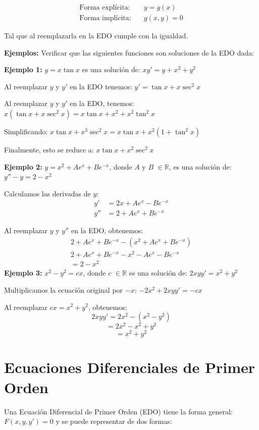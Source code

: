 \documentclass[12pt,letterpaper]{article}
\begin{document}
\[
\begin{aligned}
\text{Forma explícita:} & \quad y = g(x) \\
\text{Forma implícita:} & \quad g(x, y) = 0
\end{aligned}
\]

Tal que al reemplazarla en la EDO cumple con la igualdad.

\textbf{Ejemplos:} Verificar que las siguientes funciones son soluciones de la EDO dada:

\textbf{Ejemplo 1:}
$y = x\tan x$
es una solución de:
$xy' = y + x^2 + y^2$

Al reemplazar $y$ y $y'$ en la EDO tenemos:
$y' = \tan x + x\sec^2 x$

Al reemplazar $y$ y $y'$ en la EDO, tenemos:
$x(\tan x + x\sec^2 x) = x\tan x + x^2 + x ^2\tan ^2 x$

Simplificando:
$x\tan x + x^3\sec^2 x = x\tan x + x^2(1 + \tan^2 x)$

Finalmente, esto se reduce a:
$x\tan x + x^2\sec^2 x$


\textbf{Ejemplo 2:} $y = x^2 + A e^x + B e^{-x}$, donde $A$ y $B$ $\in\mathbb{R}$, 
es una solución de:
$y'' - y = 2 - x^2$

Calculamos las derivadas de $y$:
\[
\begin{aligned}
y' &= 2x + A e^x - B e^{-x} \\
y'' &= 2 + A e^x + B e^{-x}
\end{aligned}
\]

Al reemplazar $y$ y $y''$ en la EDO, obtenemos:
\[
\begin{aligned}
2 + A e^x + B e^{-x} - (x^2 + A e^x + B e^{-x}) \\
2 + A e^x + B e^{-x} - x^2 - A e^x - B e^{-x} \\
=2 - x^2
\end{aligned}
\]
\textbf{Ejemplo 3:}
$x^2 - y^2 = cx$, donde $c$ $\in\mathbb{R}$
es una solución de:
$2xyy' = x^2 + y^2$

Multiplicamos la ecuación original por $-x$:
$-2x^2 + 2xyy' = -cx$

Al reemplazar $cx = x^2 + y^2$, obtenemos:
\[2xyy' = 2x^2-(x^2-y^2)\]
\[=2x^2-x^2 + y^2\]
\[= x^2 + y^2\]

\section*{Ecuaciones Diferenciales de Primer Orden}

Una Ecuación Diferencial de Primer Orden (EDO) tiene la forma general: $F(x, y, y') = 0$ y se puede representar de dos formas:
\end{document}
